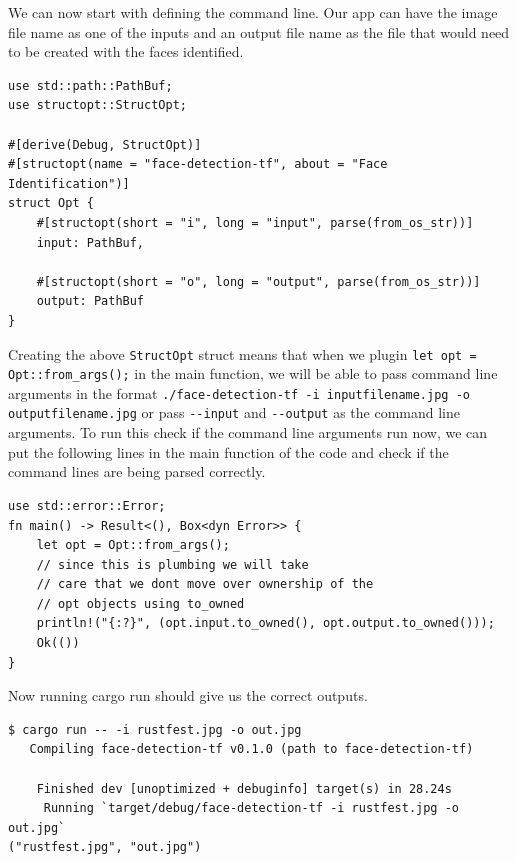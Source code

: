 \documentclass{book}
\begin{document}
We can now start with defining the command line. Our app can have the image file name as one of the inputs and an output file name as the file that would need to be created with the faces identified.

\begin{lstlisting}[caption={chapter6/face-detection-tf/src/main.rs}, basicstyle=\small]
use std::path::PathBuf;
use structopt::StructOpt;

#[derive(Debug, StructOpt)]
#[structopt(name = "face-detection-tf", about = "Face Identification")]
struct Opt {
    #[structopt(short = "i", long = "input", parse(from_os_str))]
    input: PathBuf,

    #[structopt(short = "o", long = "output", parse(from_os_str))]
    output: PathBuf
}
\end{lstlisting}

Creating the above \lstinline{StructOpt} struct means that when we plugin \lstinline{let opt = Opt::from_args();} in the main function, we will be able to pass command line arguments in the format \lstinline{./face-detection-tf -i inputfilename.jpg -o outputfilename.jpg} or pass \lstinline{--input} and \lstinline{--output} as the command line arguments. To run this check if the command line arguments run now, we can put the following lines in the main function of the code and check if the command lines are being parsed correctly.

\begin{lstlisting}[caption={chapter6/face-detection-tf/src/main.rs}, basicstyle=\small]
use std::error::Error;
fn main() -> Result<(), Box<dyn Error>> {
    let opt = Opt::from_args();
    // since this is plumbing we will take
    // care that we dont move over ownership of the
    // opt objects using to_owned
    println!("{:?}", (opt.input.to_owned(), opt.output.to_owned()));
    Ok(())
}
\end{lstlisting}

Now running cargo run should give us the correct outputs.

\begin{lstlisting}[caption={chapter6/face-detection-tf/src/main.rs}, basicstyle=\small]
$ cargo run -- -i rustfest.jpg -o out.jpg
   Compiling face-detection-tf v0.1.0 (path to face-detection-tf)

    Finished dev [unoptimized + debuginfo] target(s) in 28.24s
     Running `target/debug/face-detection-tf -i rustfest.jpg -o out.jpg`
("rustfest.jpg", "out.jpg")
\end{lstlisting}
\end{document}
